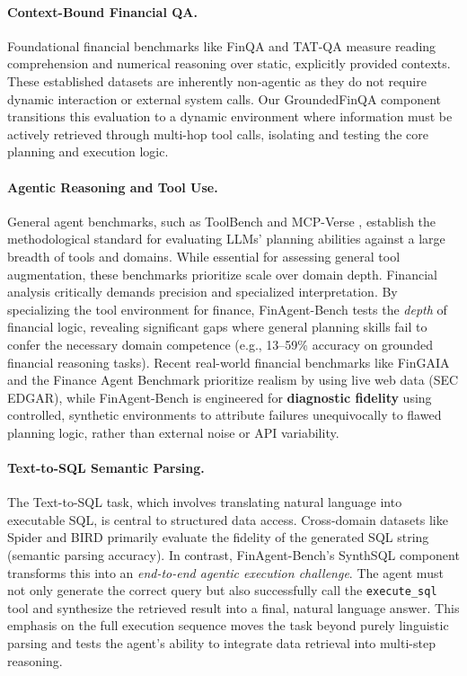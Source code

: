 \documentclass[11pt]{article}
\newcommand{\datasetname}{FinAgent-Bench\xspace}
\newcommand{\synthsubset}{SynthSQL\xspace}
\newcommand{\groundedfinqa}{GroundedFinQA\xspace}
\begin{document}
\paragraph{Context-Bound Financial QA.}
Foundational financial benchmarks like FinQA \citep{chen2021finqa} and TAT-QA \citep{zhu-etal-2021-tat} measure reading
comprehension and numerical reasoning over static, explicitly provided contexts. These established datasets are inherently
non-agentic as they do not require dynamic interaction or external system calls. Our \groundedfinqa component transitions this
evaluation to a dynamic environment where information must be actively retrieved through multi-hop tool calls, isolating and
testing the core planning and execution logic.

\paragraph{Agentic Reasoning and Tool Use.}
General agent benchmarks, such as ToolBench \citep{qin2023tool} and MCP-Verse \citep{lei2025mcpverse}, establish the methodological
standard for evaluating LLMs'
planning abilities against a large breadth of tools and domains. While essential for assessing general tool augmentation, these
benchmarks prioritize scale over domain depth. Financial analysis critically demands precision and specialized interpretation. By
specializing the tool environment for finance, \datasetname tests the \textit{depth} of financial logic, revealing significant gaps
where general planning skills fail to confer the necessary domain competence (e.g., 13--59\% accuracy on grounded financial reasoning
tasks). Recent real-world financial benchmarks like FinGAIA \citep{zeng2025fingaiachinesebenchmarkai}
and the Finance Agent Benchmark \citep{bigeard2025financeagentbenchmarkbenchmarking} prioritize realism by using live web data (SEC
EDGAR), while \datasetname is engineered for \textbf{diagnostic fidelity} using controlled, synthetic environments to attribute failures
unequivocally to flawed planning logic, rather than external noise or API variability.

\paragraph{Text-to-SQL Semantic Parsing.}
The Text-to-SQL task, which involves translating natural language into executable SQL, is central to structured data access.
Cross-domain datasets like Spider \citep{spider} and BIRD \citep{li2024can} primarily evaluate the fidelity of the generated
SQL string (semantic parsing accuracy). In contrast, \datasetname's \synthsubset component transforms this into an
\textit{end-to-end agentic execution challenge}. The agent must not only generate the correct query but also successfully call the
\texttt{execute\_sql} tool and synthesize the retrieved result into a final, natural language answer. This emphasis on the full
execution sequence moves the task beyond purely linguistic parsing and tests the agent's ability to integrate data retrieval into
multi-step reasoning.
\end{document}
